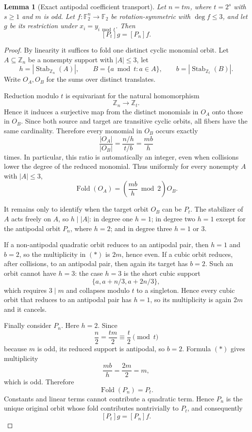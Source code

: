 \documentclass[11pt,a4paper]{article}
\newtheorem{lemma}[theorem]{Lemma}
\newcommand{\F}{\mathbb F_2}
\begin{document}
\begin{lemma}[Exact antipodal coefficient transport]\label{lem:antipodal-transport}
Let $n=tm$, where $t=2^s$ with $s\ge1$ and $m$ is odd. Let $f:\F^n\to\F$ be rotation-symmetric with $\deg f\le3$, and let $g$ be its restriction under $x_i=y_{i\bmod t}$. Then
\[
\boxed{[P_t]g=[P_n]f.}
\]
\end{lemma}
\begin{proof}
By linearity it suffices to fold one distinct cyclic monomial orbit. Let $A\subseteq\mathbb Z_n$ be a nonempty support with $|A|\le3$, let
\[
h=|\operatorname{Stab}_{\mathbb Z_n}(A)|,\qquad
B=\{a\bmod t:a\in A\},\qquad
b=|\operatorname{Stab}_{\mathbb Z_t}(B)|.
\]
Write $O_A,O_B$ for the sums over distinct translates.

Reduction modulo $t$ is equivariant for the natural homomorphism
\[
\mathbb Z_n\longrightarrow\mathbb Z_t.
\]
Hence it induces a surjective map from the distinct monomials in $O_A$ onto those in $O_B$. Since both source and target are transitive cyclic orbits, all fibers have the same cardinality. Therefore every monomial in $O_B$ occurs exactly
\[
\frac{|O_A|}{|O_B|}
=
\frac{n/h}{t/b}
=
\frac{mb}{h}
\]
times. In particular, this ratio is automatically an integer, even when collisions lower the degree of the reduced monomial. Thus uniformly for every nonempty $A$ with $|A|\le3$,
\[
\boxed{
\operatorname{Fold}(O_A)
=
\left(\frac{mb}{h}\bmod2\right)O_B.
}
\tag{*}
\]

It remains only to identify when the target orbit $O_B$ can be $P_t$. The stabilizer of $A$ acts freely on $A$, so $h\mid |A|$: in degree one $h=1$; in degree two $h=1$ except for the antipodal orbit $P_n$, where $h=2$; and in degree three $h=1$ or $3$.

If a non-antipodal quadratic orbit reduces to an antipodal pair, then $h=1$ and $b=2$, so the multiplicity in \((*)\) is $2m$, hence even. If a cubic orbit reduces, after collisions, to an antipodal pair, then again its target has $b=2$. Such an orbit cannot have $h=3$: the case $h=3$ is the short cubic support
\[
\{a,a+n/3,a+2n/3\},
\]
which requires $3\mid m$ and collapses modulo $t$ to a singleton. Hence every cubic orbit that reduces to an antipodal pair has $h=1$, so its multiplicity is again $2m$ and it cancels.

Finally consider $P_n$. Here $h=2$. Since
\[
\frac n2=\frac{tm}{2}\equiv \frac t2\pmod t
\]
because $m$ is odd, its reduced support is antipodal, so $b=2$. Formula \((*)\) gives multiplicity
\[
\frac{mb}{h}=\frac{2m}{2}=m,
\]
which is odd. Therefore
\[
\operatorname{Fold}(P_n)=P_t.
\]
Constants and linear terms cannot contribute a quadratic term. Hence $P_n$ is the unique original orbit whose fold contributes nontrivially to $P_t$, and consequently
\[
[P_t]g=[P_n]f.
\]
\end{proof}
\end{document}
